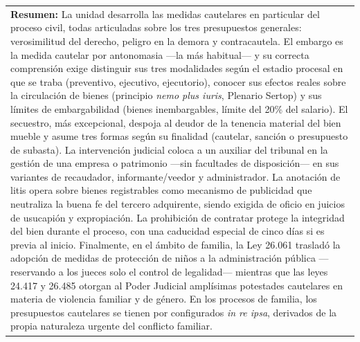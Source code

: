 \documentclass[12pt,oneside]{book}
\begin{document}
\begin{longtable}{p{} p{}}
\multicolumn{2}{p{0.94\textwidth}}{
\textbf{Resumen:} La unidad desarrolla las medidas cautelares en particular del proceso civil, todas articuladas sobre los tres presupuestos generales: verosimilitud del derecho, peligro en la demora y contracautela. El embargo es la medida cautelar por antonomasia ---la más habitual--- y su correcta comprensión exige distinguir sus tres modalidades según el estadio procesal en que se traba (preventivo, ejecutivo, ejecutorio), conocer sus efectos reales sobre la circulación de bienes (principio \textit{nemo plus iuris}, Plenario Sertop) y sus límites de embargabilidad (bienes inembargables, límite del 20\% del salario). El secuestro, más excepcional, despoja al deudor de la tenencia material del bien mueble y asume tres formas según su finalidad (cautelar, sanción o presupuesto de subasta). La intervención judicial coloca a un auxiliar del tribunal en la gestión de una empresa o patrimonio ---sin facultades de disposición--- en sus variantes de recaudador, informante/veedor y administrador. La anotación de litis opera sobre bienes registrables como mecanismo de publicidad que neutraliza la buena fe del tercero adquirente, siendo exigida de oficio en juicios de usucapión y expropiación. La prohibición de contratar protege la integridad del bien durante el proceso, con una caducidad especial de cinco días si es previa al inicio. Finalmente, en el ámbito de familia, la Ley 26.061 trasladó la adopción de medidas de protección de niños a la administración pública ---reservando a los jueces solo el control de legalidad--- mientras que las leyes 24.417 y 26.485 otorgan al Poder Judicial amplísimas potestades cautelares en materia de violencia familiar y de género. En los procesos de familia, los presupuestos cautelares se tienen por configurados \textit{in re ipsa}, derivados de la propia naturaleza urgente del conflicto familiar.
} \\

\end{longtable}
\end{document}
